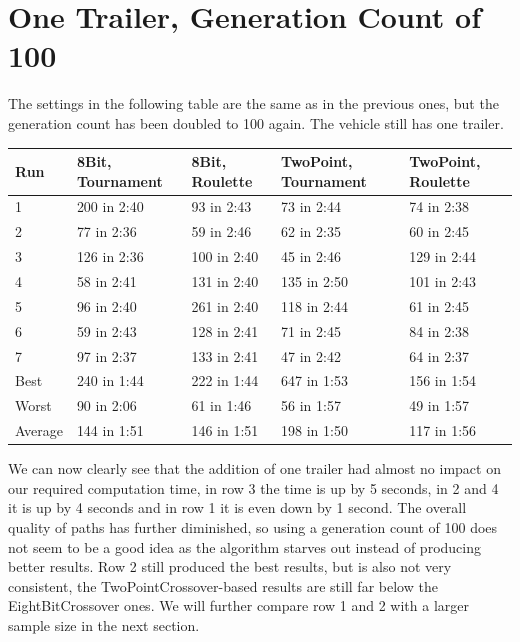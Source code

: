 \section{One Trailer, Generation Count of 100}
\label{sec:no_trailer_100}

The settings in the following table are the same as in the previous ones, but the generation count has been doubled to 100 again. The vehicle still has one trailer.

\begin{center}
	\begin{tabular}{| l | l | l | p{3cm} | p{3cm}|}
		\hline
		Run 		& 8Bit, Tournament 	& 8Bit, Roulette 	& TwoPoint, Tournament 	& TwoPoint, Roulette	\\ \hline
		1				& 200 in 2:40				& 93 in 2:43			& 73 in 2:44						& 74 in 2:38					\\ \hline
		2				& 77 in 2:36				& 59 in 2:46			& 62 in 2:35						& 60 in 2:45					\\ \hline
		3				& 126 in 2:36				& 100 in 2:40			& 45 in 2:46						& 129 in 2:44					\\ \hline
		4				& 58 in 2:41				& 131 in 2:40			& 135 in 2:50						& 101 in 2:43					\\ \hline
		5				& 96 in 2:40				& 261 in 2:40			& 118 in 2:44						& 61 in 2:45					\\ \hline
		6				& 59 in 2:43				& 128 in 2:41			& 71 in 2:45						& 84 in 2:38					\\ \hline
		7				& 97 in 2:37				& 133 in 2:41			& 47 in 2:42						& 64 in 2:37					\\ \hline
		Best		&	240 in 1:44				&	222 in 1:44			&	647 in 1:53						&	156 in 1:54					\\ \hline
		Worst		&	90 in 2:06				&	61 in 1:46			&	56 in 1:57						& 49 in 1:57					\\ \hline
		Average	&	144 in 1:51				& 146 in 1:51			& 198 in 1:50						&	117 in 1:56					\\ \hline
		\hline
	\end{tabular}
\end{center}

We can now clearly see that the addition of one trailer had almost no impact on our required computation time, in row 3 the time is up by 5 seconds, in 2 and 4 it is up by 4 seconds and in row 1 it is even down by 1 second. The overall quality of paths has further diminished, so using a generation count of 100 does not seem to be a good idea as the algorithm starves out instead of producing better results. Row 2 still produced the best results, but is also not very consistent, the TwoPointCrossover-based results are still far below the EightBitCrossover ones. We will further compare row 1 and 2 with a larger sample size in the next section.

